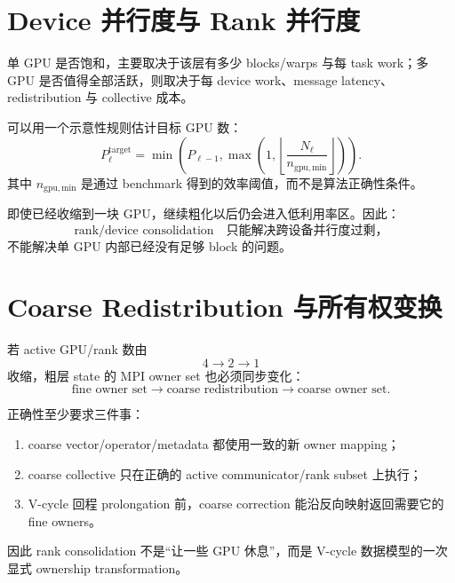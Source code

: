 \section{Device 并行度与 Rank 并行度}

单 GPU 是否饱和，主要取决于该层有多少 blocks/warps 与每 task work；多 GPU 是否值得全部活跃，则取决于每 device work、message latency、redistribution 与 collective 成本。

可以用一个示意性规则估计目标 GPU 数：
\begin{equation}
P_\ell^{\mathrm{target}}
=
\min
\left(
P_{\ell-1},
\max
\left(
1,
\left\lfloor
\frac{N_\ell}{n_{\mathrm{gpu,min}}}
\right\rfloor
\right)
\right).
\label{eq:distributed-gpu-target-ranks}
\end{equation}
其中 $n_{\mathrm{gpu,min}}$ 是通过 benchmark 得到的效率阈值，而不是算法正确性条件。

即使已经收缩到一块 GPU，继续粗化以后仍会进入低利用率区。因此：
\begin{equation}
\boxed{
\text{rank/device consolidation}
\quad
\text{只能解决跨设备并行度过剩，}
}
\end{equation}
不能解决单 GPU 内部已经没有足够 block 的问题。

\section{Coarse Redistribution 与所有权变换}

若 active GPU/rank 数由
\begin{equation}
4
\rightarrow
2
\rightarrow
1
\end{equation}
收缩，粗层 state 的 MPI owner set 也必须同步变化：
\begin{equation}
\text{fine owner set}
\rightarrow
\text{coarse redistribution}
\rightarrow
\text{coarse owner set}.
\label{eq:distributed-gpu-owner-transition}
\end{equation}

正确性至少要求三件事：

\begin{enumerate}
\item coarse vector/operator/metadata 都使用一致的新 owner mapping；
\item coarse collective 只在正确的 active communicator/rank subset 上执行；
\item V-cycle 回程 prolongation 前，coarse correction 能沿反向映射返回需要它的 fine owners。
\end{enumerate}

因此 rank consolidation 不是“让一些 GPU 休息”，而是 V-cycle 数据模型的一次显式 ownership transformation。


